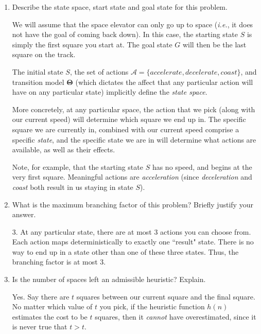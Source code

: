 \documentclass[12pt]{article}
\begin{document}
\begin{enumerate}
\item Describe the state space, start state and goal state for this problem.
\begin{solution}
We will assume that the space elevator can only go up to space (\textit{i.e.}, it does not have the goal of coming back down). In this case, the starting state $S$ is simply the first square you start at. The goal state $G$ will then be the last square on the track.
\newline

The initial state $S$, the set of actions $\mathcal{A} = \{ accelerate, decelerate, coast \}$, and transition model $\mathbf{ \Theta }$ (which dictates the affect that any particular action will have on any particular state) implicitly define the \textit{state space}.
\newline

More concretely, at any particular space, the action that we pick (along with our current speed) will determine which square we end up in. The specific square we are currently in, combined with our current speed comprise a specific \textit{state}, and the specific state we are in will determine what actions are available, as well as their effects.
\newline

Note, for example, that the starting state $S$ has no speed, and begins at the very first square. Meaningful actions are \textit{acceleration} (since \textit{deceleration} and \textit{coast} both result in us staying in state $S$).
\end{solution}

\item What is the maximum branching factor of this problem? Briefly justify your answer.
\begin{solution}
3. At any particular state, there are at most 3 actions you can choose from. Each action maps deterministically to exactly one ``result" state. There is no way to end up in a state other than one of these three states. Thus, the branching factor is at most 3.
\end{solution}

\item Is the number of spaces left an admissible heuristic? Explain.
\begin{solution}
Yes. Say there are $t$ squares between our current square and the final square. No matter which value of $t$ you pick, if the heuristic function $h(n)$ estimates the cost to be $t$ squares, then it \textit{cannot} have overestimated, since it is never true that $t > t$.
\end{solution}


\end{enumerate}
\end{document}
